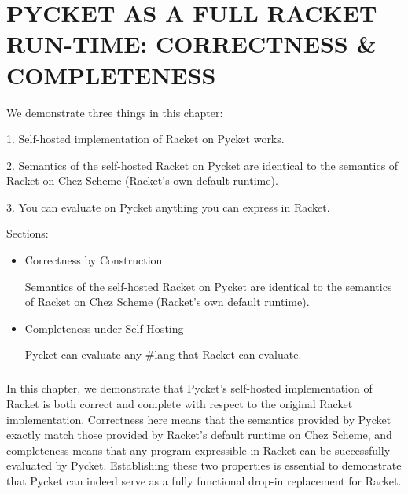 \chapter[\texorpdfstring{PYCKET AS A FULL RACKET RUN-TIME: CORRECTNESS \& COMPLETENESS}
                          {5. Validation}]{PYCKET AS A FULL RACKET RUN-TIME: CORRECTNESS \& COMPLETENESS}

	\label{chapter:validation}

	\begin{chaptersynopsis}
		\footnotesize

        We demonstrate three things in this chapter:

        1. Self-hosted implementation of Racket on Pycket works.

        2. Semantics of the self-hosted Racket on Pycket are identical to the semantics of Racket on Chez Scheme (Racket's own default runtime).

        3. You can evaluate on Pycket anything you can express in Racket.

        \vspace{2em}

        Sections:
		\begin{itemize}
			\item Correctness by Construction

                Semantics of the self-hosted Racket on Pycket are identical to the semantics of Racket on Chez Scheme (Racket's own default runtime).
			\item Completeness under Self-Hosting

                Pycket can evaluate any \#lang that Racket can evaluate.
		\end{itemize}
    \end{chaptersynopsis}

	\paragraph{}%
		In this chapter, we demonstrate that Pycket's self-hosted implementation of Racket is both correct and complete with respect to the original Racket implementation. Correctness here means that the semantics provided by Pycket exactly match those provided by Racket's default runtime on Chez Scheme, and completeness means that any program expressible in Racket can be successfully evaluated by Pycket. Establishing these two properties is essential to demonstrate that Pycket can indeed serve as a fully functional drop-in replacement for Racket.

